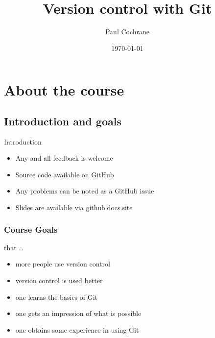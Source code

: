 \documentclass{git_course}
\begin{document}
\author{Paul Cochrane}
\title[Version control with Git]
        {Version control with Git}
\date{\today}

\maketitle

\begin{frame}
\begin{multicols}{2}
\begin{spacing}{0.8}
\tableofcontents
\end{spacing}
\end{multicols}
\end{frame}


\section{About the course}

\subsection{Introduction and goals}
\begin{frame}{Introduction}
\begin{itemize}
    \item Any and all feedback is welcome
    \item Source code available on GitHub
    \item Any problems can be noted as a GitHub issue
    \item Slides are available via github.docs.site
\end{itemize}
\end{frame}

\begin{frame}
\frametitle{Course Goals}
that \ldots
\begin{itemize}
    \item more people use version control
    \item version control is used better
    \item one learns the basics of Git
    \item one gets an impression of what is possible
    \item one obtains some experience in using Git
\end{itemize}
\end{frame}
\end{document}
